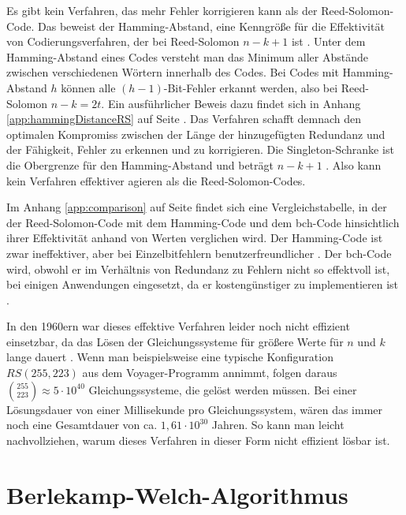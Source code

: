 Es gibt kein Verfahren, das mehr Fehler korrigieren kann als der Reed-Solomon-Code.
Das beweist der Hamming-Abstand, eine Kenngröße für die Effektivität von Codierungsverfahren, der bei Reed-Solomon $n-k+1$ ist \cite{reedPolynomialCodesCertain1960}.
Unter dem Hamming-Abstand eines Codes versteht man das Minimum aller Abstände zwischen verschiedenen Wörtern innerhalb des Codes.
Bei Codes mit Hamming-Abstand $h$ können alle $(h-1)$-Bit-Fehler erkannt werden, also bei Reed-Solomon $n-k=2t$.
Ein ausführlicher Beweis dazu findet sich in Anhang \ref{app:hammingDistanceRS} auf Seite \pageref{app:hammingDistanceRS}.
Das Verfahren schafft demnach den optimalen Kompromiss zwischen der Länge der hinzugefügten Redundanz und der Fähigkeit, Fehler zu erkennen und zu korrigieren.
Die Singleton-Schranke ist die Obergrenze für den Hamming-Abstand und beträgt $n-k+1$ \cite[Kapitel 3.3]{friedrichsKanalcodierung1996}.
Also kann kein Verfahren effektiver agieren als die Reed-Solomon-Codes.

Im Anhang \ref{app:comparison} auf Seite \pageref{app:comparison} findet sich eine Vergleichstabelle, in der der Reed-Solomon-Code mit dem Hamming-Code und dem \acrshort{bch}-Code hinsichtlich ihrer Effektivität anhand von Werten verglichen wird.
Der Hamming-Code ist zwar ineffektiver, aber bei Einzelbitfehlern benutzerfreundlicher \cite{williamsHammingCodeFehlererkennungUnd2024}.
Der \acrshort{bch}-Code wird, obwohl er im Verhältnis von Redundanz zu Fehlern nicht so effektvoll ist, bei einigen Anwendungen eingesetzt, da er kostengünstiger zu implementieren ist \cite[Kapitel 3]{schulz-hankeBCHCodesCombined2023}. 

In den 1960ern war dieses effektive Verfahren leider noch nicht effizient einsetzbar, da das Lösen der Gleichungssysteme für größere Werte für $n$ und $k$ lange dauert \cite{verbeureReedSolomonErrorCorrecting2022}. 
Wenn man beispielsweise eine typische Konfiguration $RS(255,223)$ aus dem Voyager-Programm annimmt, folgen daraus $\binom{255}{223}\approx5\cdot 10^{40}$ Gleichungssysteme, die gelöst werden müssen.
Bei einer Lösungsdauer von einer Millisekunde pro Gleichungssystem, wären das immer noch eine Gesamtdauer von ca. $1,61\cdot10^{30}$ Jahren. 
So kann man leicht nachvollziehen, warum dieses Verfahren in dieser Form nicht effizient lösbar ist.

\section{Berlekamp-Welch-Algorithmus}\label{sec:bwAlgo}

